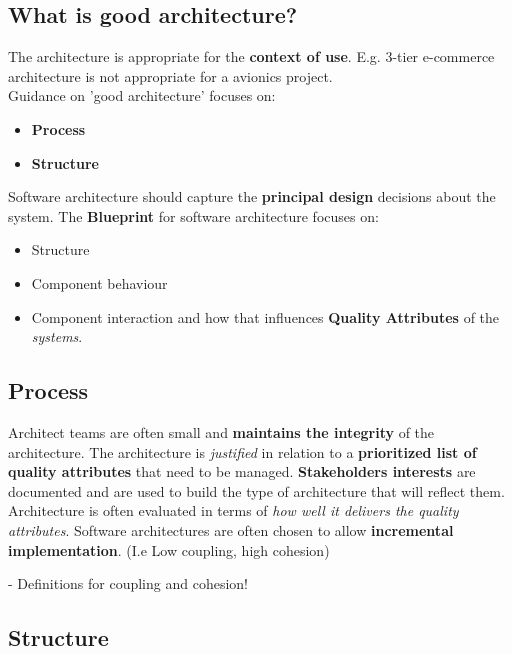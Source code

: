 \documentclass[a4paper]{article}
\begin{document}
\subsection{What is good architecture?}
The architecture is appropriate for the \textbf{context of use}. E.g. 3-tier e-commerce architecture is not appropriate for a avionics project.\\

Guidance on 'good architecture' focuses on:
\begin{itemize}
\item \textbf{Process}
\item \textbf{Structure}\\
\end{itemize}



Software architecture should capture the \textbf{principal design} decisions about the system. The \textbf{Blueprint} for software architecture focuses on:
\begin{itemize}
\item Structure
\item Component behaviour
\item Component interaction and how that influences \textbf{Quality Attributes} of the \textit{systems}.\\
\end{itemize}

\subsection{Process}
Architect teams are often small and \textbf{maintains the integrity} of the architecture. The architecture is \textit{justified} in relation to a \textbf{prioritized list of quality attributes} that need to be managed. \textbf{Stakeholders interests} are documented and are used to build the type of architecture that will reflect them.\\

Architecture is often evaluated in terms of \textit{how well it delivers the quality attributes}. Software architectures are often chosen to allow \textbf{incremental implementation}. (I.e Low coupling, high cohesion)

- Definitions for coupling and cohesion!

\subsection{Structure}
\end{document}

